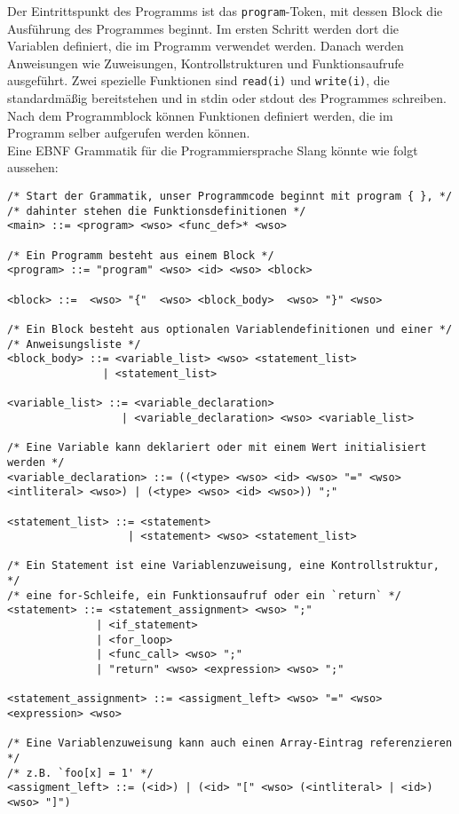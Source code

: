 Der Eintrittspunkt des Programms ist das \texttt{program}-Token, mit dessen Block die Ausführung des Programmes beginnt.
Im ersten Schritt werden dort die Variablen definiert, die im Programm verwendet werden.
Danach werden Anweisungen wie Zuweisungen, Kontrollstrukturen und Funktionsaufrufe ausgeführt.
Zwei spezielle Funktionen sind \texttt{read(i)} und \texttt{write(i)}, die standardmäßig bereitstehen und in stdin oder stdout des Programmes schreiben.
Nach dem Programmblock können Funktionen definiert werden, die im Programm selber aufgerufen werden können.\\

Eine EBNF Grammatik für die Programmiersprache Slang könnte wie folgt aussehen:

\begin{lstlisting}
/* Start der Grammatik, unser Programmcode beginnt mit program { }, */
/* dahinter stehen die Funktionsdefinitionen */
<main> ::= <program> <wso> <func_def>* <wso>

/* Ein Programm besteht aus einem Block */
<program> ::= "program" <wso> <id> <wso> <block>

<block> ::=  <wso> "{"  <wso> <block_body>  <wso> "}" <wso>

/* Ein Block besteht aus optionalen Variablendefinitionen und einer */ 
/* Anweisungsliste */
<block_body> ::= <variable_list> <wso> <statement_list>
               | <statement_list>

<variable_list> ::= <variable_declaration>
                  | <variable_declaration> <wso> <variable_list>

/* Eine Variable kann deklariert oder mit einem Wert initialisiert werden */
<variable_declaration> ::= ((<type> <wso> <id> <wso> "=" <wso> <intliteral> <wso>) | (<type> <wso> <id> <wso>)) ";"

<statement_list> ::= <statement>
                   | <statement> <wso> <statement_list>

/* Ein Statement ist eine Variablenzuweisung, eine Kontrollstruktur, */
/* eine for-Schleife, ein Funktionsaufruf oder ein `return` */
<statement> ::= <statement_assignment> <wso> ";"
              | <if_statement>
              | <for_loop>
              | <func_call> <wso> ";"
              | "return" <wso> <expression> <wso> ";"

<statement_assignment> ::= <assigment_left> <wso> "=" <wso> <expression> <wso>

/* Eine Variablenzuweisung kann auch einen Array-Eintrag referenzieren */
/* z.B. `foo[x] = 1' */
<assigment_left> ::= (<id>) | (<id> "[" <wso> (<intliteral> | <id>) <wso> "]")


\end{lstlisting}
